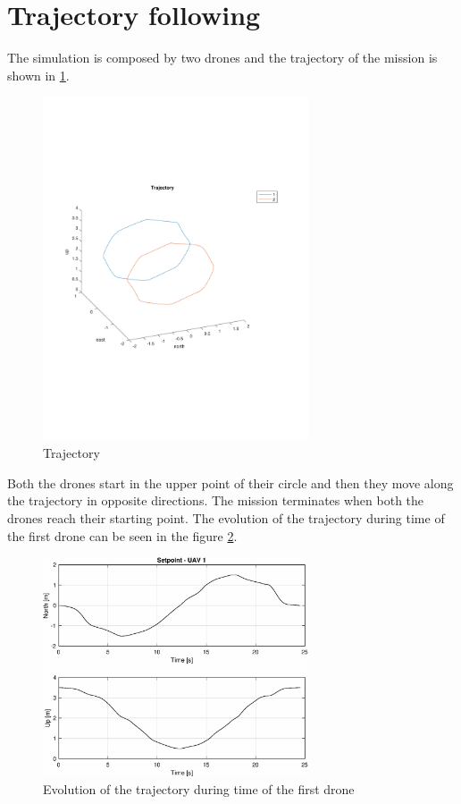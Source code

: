 \section{Trajectory following}

The simulation is composed by two drones and the trajectory of the mission is shown
in \ref{fig:trajectory}.

\begin{figure}
\centering
\includegraphics[width=0.7\textwidth]{chapters/chapter-04/figures/trajectory.pdf}
\caption{Trajectory}
\label{fig:trajectory}
\end{figure}

Both the drones start in the upper point of their circle and then they move along the
trajectory in opposite directions. The mission terminates when both the drones reach
their starting point.
The evolution of the trajectory during time of the first drone can be seen in the figure
\ref{fig:trajectory_during_time}.

\begin{figure}
\centering
\includegraphics[width=0.7\textwidth]{chapters/chapter-04/figures/pos.eps}
\caption{Evolution of the trajectory during time of the first drone}
\label{fig:trajectory_during_time}
\end{figure}

